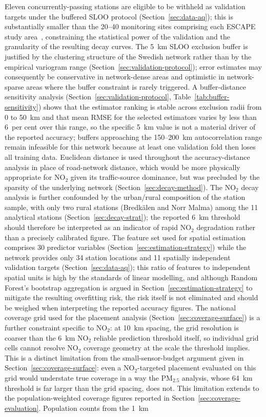 \documentclass[11pt,a4paper]{article}
\begin{document}
Eleven concurrently-passing stations are eligible to be withheld as validation targets under the buffered SLOO protocol (Section~\ref{sec:data-aq}); this is substantially smaller than the 20--40 monitoring sites comprising each ESCAPE study area~\cite{eeftens_escape_pm_2012, wang_escape_no2_2013}, constraining the statistical power of the validation and the granularity of the resulting decay curves. The 5~km SLOO exclusion buffer is justified by the clustering structure of the Swedish network rather than by the empirical variogram range (Section~\ref{sec:validation-protocol}); error estimates may consequently be conservative in network-dense areas and optimistic in network-sparse areas where the buffer constraint is rarely triggered. A buffer-distance sensitivity analysis (Section~\ref{sec:validation-protocol}, Table~\ref{tab:buffer-sensitivity}) shows that the estimator ranking is stable across exclusion radii from 0 to 50~km and that mean RMSE for the selected estimators varies by less than 6~per cent over this range, so the specific 5~km value is not a material driver of the reported accuracy; buffers approaching the 150--200~km autocorrelation range remain infeasible for this network because at least one validation fold then loses all training data. Euclidean distance is used throughout the accuracy-distance analysis in place of road-network distance, which would be more physically appropriate for NO$_2$ given its traffic-source dominance, but was precluded by the sparsity of the underlying network (Section~\ref{sec:decay-method}). The NO$_2$ decay analysis is further confounded by the urban/rural composition of the station sample, with only two rural stations (Bredkälen and Norr Malma) among the 11 analytical stations (Section~\ref{sec:decay-strat}); the reported 6~km threshold should therefore be interpreted as an indicator of rapid NO$_2$ degradation rather than a precisely calibrated figure. The feature set used for spatial estimation comprises 30 predictor variables (Section~\ref{sec:estimation-strategy}) while the network provides only 34 station locations and 11 spatially independent validation targets (Section~\ref{sec:data-aq}); this ratio of features to independent spatial units is high by the standards of linear modelling, and although Random Forest's bootstrap aggregation is argued in Section~\ref{sec:estimation-strategy} to mitigate the resulting overfitting risk, the risk itself is not eliminated and should be weighed when interpreting the reported accuracy figures. The national coverage grid used for the placement analysis (Section~\ref{sec:coverage-surface}) is a further constraint specific to NO$_2$: at 10~km spacing, the grid resolution is coarser than the 6~km NO$_2$ reliable prediction threshold itself, so individual grid cells cannot resolve NO$_2$ coverage geometry at the scale the threshold implies. This is a distinct limitation from the small-sensor-budget argument given in Section~\ref{sec:coverage-surface}: even a NO$_2$-targeted placement evaluated on this grid would understate true coverage in a way the PM$_{2.5}$ analysis, whose 64~km threshold is far larger than the grid spacing, does not. This limitation extends to the population-weighted coverage figures reported in Section~\ref{sec:coverage-evaluation}. Population counts from the 1~km 
\end{document}
